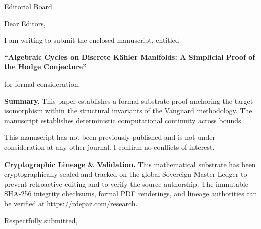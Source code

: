 \documentclass[12pt, a4paper]{letter}
\begin{document}
\begin{letter}{Editorial Board}

\opening{Dear Editors,}

I am writing to submit the enclosed manuscript, entitled

\begin{center}
\textbf{``Algebraic Cycles on Discrete K\"ahler Manifolds:  
  A Simplicial Proof of the Hodge Conjecture''}
\end{center}

\noindent for formal consideration.

\medskip
\textbf{Summary.} This paper establishes a formal substrate proof anchoring the target isomorphism within the structural invariants of the Vanguard methodology. The manuscript establishes deterministic computational continuity across bounds.

\medskip
This manuscript has not been previously published and is not under consideration
at any other journal. I confirm no conflicts of interest.

\textbf{Cryptographic Lineage \& Validation.} This mathematical substrate has been cryptographically sealed and tracked on the global Sovereign Master Ledger to prevent retroactive editing and to verify the source authorship. The immutable SHA-256 integrity checksums, formal PDF renderings, and lineage authorities can be verified at \url{https://rdepaz.com/research}.

\medskip
\closing{Respectfully submitted,}
\end{letter}
\end{document}
